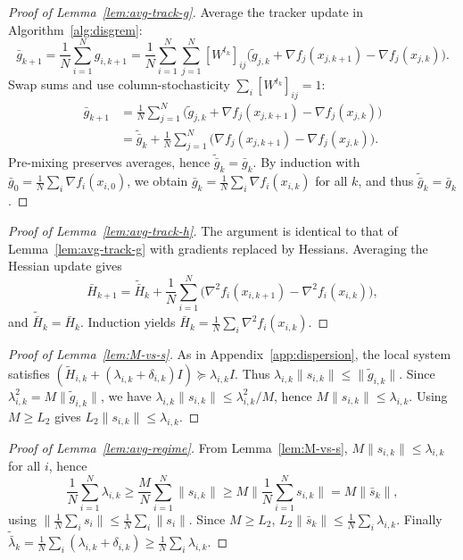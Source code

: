 \documentclass[review,onefignum,onetabnum]{siamart171218}
\begin{document}
	\begin{proof}[Proof of Lemma~\ref{lem:avg-track-g}]
		Average the tracker update in Algorithm~\ref{alg:disgrem}:
		\[
		\bar g_{k+1}
		=\frac1N\sum_{i=1}^N g_{i,k+1}
		=\frac1N\sum_{i=1}^N\sum_{j=1}^N [W^{t_k}]_{ij}\Big(\tilde g_{j,k}+\nabla f_j(x_{j,k+1})-\nabla f_j(x_{j,k})\Big).
		\]
		Swap sums and use column-stochasticity $\sum_i [W^{t_k}]_{ij}=1$:
		\begin{align*}
			\bar g_{k+1}&=\tfrac1N\textstyle\sum_{j=1}^N\!\Big(\tilde g_{j,k}+\nabla f_j(x_{j,k+1})-\nabla f_j(x_{j,k})\Big)\\
			&=\tilde{\bar g}_k+\tfrac1N\textstyle\sum_{j=1}^N\!\big(\nabla f_j(x_{j,k+1})-\nabla f_j(x_{j,k})\big).
		\end{align*}
		Pre-mixing preserves averages, hence $\tilde{\bar g}_k=\bar g_k$.
		By induction with $\bar g_0=\frac1N\sum_i \nabla f_i(x_{i,0})$, we obtain
		$\bar g_k=\frac1N\sum_i \nabla f_i(x_{i,k})$ for all $k$, and thus $\tilde{\bar g}_k=\bar g_k$.
	\end{proof}
	
	\begin{proof}[Proof of Lemma~\ref{lem:avg-track-h}]
		The argument is identical to that of Lemma~\ref{lem:avg-track-g} with gradients replaced by Hessians.
		Averaging the Hessian update gives
		\[
		\bar H_{k+1}=\tilde{\bar H}_k+\frac1N\sum_{i=1}^N\big(\nabla^2 f_i(x_{i,k+1})-\nabla^2 f_i(x_{i,k})\big),
		\]
		and $\tilde{\bar H}_k=\bar H_k$. Induction yields $\bar H_k=\frac1N\sum_i \nabla^2 f_i(x_{i,k})$.
	\end{proof}
	
	\begin{proof}[Proof of Lemma~\ref{lem:M-vs-s}]
		As in Appendix~\ref{app:dispersion}, the local system satisfies
		$(\tilde H_{i,k}+(\lambda_{i,k}+\delta_{i,k})I)\succeq \lambda_{i,k}I$.
		Thus $\lambda_{i,k}\|s_{i,k}\|\le \|\tilde g_{i,k}\|$.
		Since $\lambda_{i,k}^2=M\|\tilde g_{i,k}\|$, we have $\lambda_{i,k}\|s_{i,k}\|\le \lambda_{i,k}^2/M$,
		hence $M\|s_{i,k}\|\le \lambda_{i,k}$. Using $M\ge L_2$ gives $L_2\|s_{i,k}\|\le\lambda_{i,k}$.
	\end{proof}
	
	\begin{proof}[Proof of Lemma~\ref{lem:avg-regime}]
		From Lemma~\ref{lem:M-vs-s}, $M\|s_{i,k}\|\le \lambda_{i,k}$ for all $i$, hence
		\[
		\frac1N\sum_{i=1}^N\lambda_{i,k}\ge \frac{M}{N}\sum_{i=1}^N\|s_{i,k}\|\ge M\Big\|\frac1N\sum_{i=1}^N s_{i,k}\Big\|=M\|\bar s_k\|,
		\]
		using $\|\frac1N\sum_i s_i\|\le \frac1N\sum_i\|s_i\|$.
		Since $M\ge L_2$, $L_2\|\bar s_k\|\le \frac1N\sum_i\lambda_{i,k}$.
		Finally $\tilde{\bar\lambda}_k=\frac1N\sum_i(\lambda_{i,k}+\delta_{i,k})\ge \frac1N\sum_i\lambda_{i,k}$.
	\end{proof}
	
\end{document}
